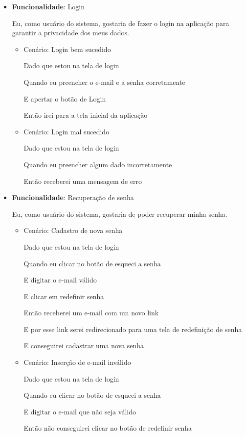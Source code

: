 \begin{itemize}
\item\textbf{Funcionalidade}: Login
    
    Eu, como usuário do sistema, gostaria de fazer o login na aplicação para garantir a privacidade dos meus dados.
    \begin{itemize}
        \item Cenário: Login bem sucedido  
        \par Dado que estou na tela de login
        \par Quando eu preencher o e-mail e a senha corretamente
        \par E apertar o botão de Login
        \par Então irei para a tela inicial da aplicação
    \end{itemize}   
    \begin{itemize}
        \item Cenário: Login mal sucedido  
        \par Dado que estou na tela de login
        \par Quando eu preencher algum dado incorretamente
        \par Então receberei uma mensagem de erro
    \end{itemize}    

\item\textbf{Funcionalidade}: Recuperação de senha
    
    Eu, como usuário do sistema, gostaria de poder recuperar minha senha.
    \begin{itemize}
        \item Cenário: Cadastro de nova senha
        \par Dado que estou na tela de login
        \par Quando eu clicar no botão de esqueci a senha
        \par E digitar o e-mail válido
        \par E clicar em redefinir senha
        \par Então receberei um e-mail com um novo link 
        \par E por esse link serei redirecionado para uma tela de redefinição de senha
        \par E conseguirei cadastrar uma nova senha
    \end{itemize}    
    \begin{itemize}
        \item Cenário: Inserção de e-mail inválido
        \par Dado que estou na tela de login
        \par Quando eu clicar no botão de esqueci a senha
        \par E digitar o e-mail que não seja válido
        \par Então não conseguirei clicar no botão de redefinir senha
    \end{itemize}    


\end{itemize}
